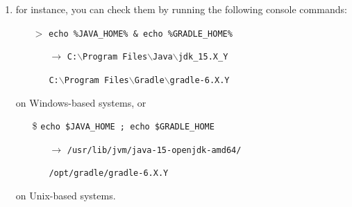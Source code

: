 \documentclass[handout]{beamer}\mode<presentation>{\usetheme{AMSCesenaPurpleAndGold}}
\begin{document}
\begin{frame}[c,allowframebreaks]
\begin{enumerate}
    \vspace{.5cm}
    
    \item for instance, you can check them by running the following console commands:
    \begin{itemize}
        \item[$>$] \texttt{echo \alert{\%}JAVA\_HOME\alert{\%} \& echo \alert{\%}GRADLE\_HOME\alert{\%}}
        \begin{itemize}
            \item[$\rightarrow$] \texttt{C:$\backslash$Program Files$\backslash$Java$\backslash$jdk\_15.X\_Y} 
            \item[] \texttt{C:$\backslash$Program Files$\backslash$Gradle$\backslash$gradle-6.X.Y} 
        \end{itemize}
    \end{itemize}
    on Windows-based systems, or
    \begin{itemize}
        \item[\$] \texttt{echo \alert{\$}JAVA\_HOME ; echo \alert{\$}GRADLE\_HOME}
        \begin{itemize}
            \item[$\rightarrow$] \texttt{/usr/lib/jvm/java-15-openjdk-amd64/}
            \item[] \texttt{/opt/gradle/gradle-6.X.Y}
        \end{itemize}
    \end{itemize}
    on Unix-based systems.
    
   \framebreak
    

\end{enumerate}
\end{frame}
\end{document}
